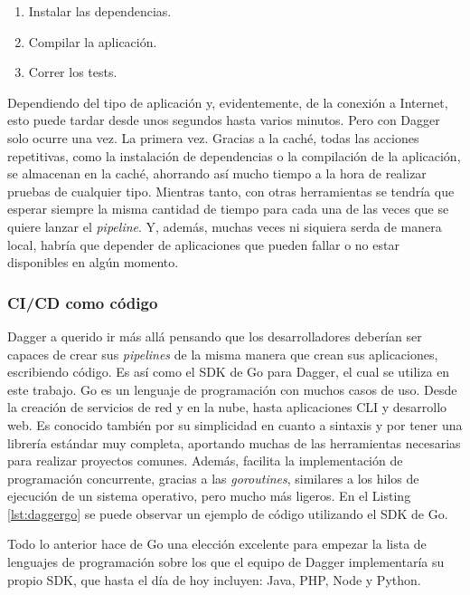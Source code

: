 \begin{enumerate}
  \item Instalar las dependencias.
  \item Compilar la aplicación.
  \item Correr los tests.
\end{enumerate}

Dependiendo del tipo de aplicación y, evidentemente, de la conexión a Internet, esto puede tardar desde unos segundos hasta varios minutos. Pero con Dagger solo ocurre una vez. La primera vez. Gracias a la caché, todas las acciones repetitivas, como la instalación de dependencias o la compilación de la aplicación, se almacenan en la caché, ahorrando así mucho tiempo a la hora de realizar pruebas de cualquier tipo. Mientras tanto, con otras herramientas se tendría que esperar siempre la misma cantidad de tiempo para cada una de las veces que se quiere lanzar el \textit{pipeline}. Y, además, muchas veces ni siquiera serda de manera local, habría que depender de aplicaciones que pueden fallar o no estar disponibles en algún momento.

\subsubsection*{CI/CD como código}
\label{subsec:cicd-code}

Dagger a querido ir más allá pensando que los desarrolladores deberían ser capaces de crear sus \textit{pipelines} de la misma manera que crean sus aplicaciones, escribiendo código. Es así como el SDK de Go\cite{go} para Dagger, el cual se utiliza en este trabajo. Go es un lenguaje de programación con muchos casos de uso. Desde la creación de servicios de red y en la nube, hasta aplicaciones CLI y desarrollo web. Es conocido también por su simplicidad en cuanto a sintaxis y por tener una librería estándar muy completa, aportando muchas de las herramientas necesarias para realizar proyectos comunes. Además, facilita la implementación de programación concurrente, gracias a las \textit{goroutines}, similares a los hilos de ejecución de un sistema operativo, pero mucho más ligeros. En el Listing \ref{lst:daggergo} se puede observar un ejemplo de código utilizando el SDK de Go.

Todo lo anterior hace de Go una elección excelente para empezar la lista de lenguajes de programación sobre los que el equipo de Dagger implementaría su propio SDK, que hasta el día de hoy incluyen: Java, PHP, Node y Python. 


